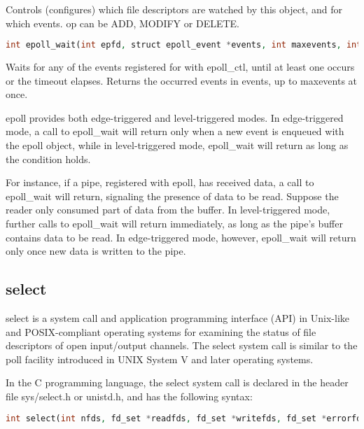 Controls (configures) which file descriptors are watched by this object, and for which events. op can be ADD, MODIFY or DELETE.





\begin{lstlisting}[language=PHP]
int epoll_wait(int epfd, struct epoll_event *events, int maxevents, int timeout);
\end{lstlisting}

Waits for any of the events registered for with epoll_ctl, until at least one occurs or the timeout elapses. Returns the occurred events in events, up to maxevents at once.

epoll provides both edge-triggered and level-triggered modes. In edge-triggered mode, a call to epoll\_wait will return only when a new event is enqueued with the epoll object, while in level-triggered mode, epoll\_wait will return as long as the condition holds.

For instance, if a pipe, registered with epoll, has received data, a call to epoll\_wait will return, signaling the presence of data to be read. Suppose the reader only consumed part of data from the buffer. In level-triggered mode, further calls to epoll\_wait will return immediately, as long as the pipe's buffer contains data to be read. In edge-triggered mode, however, epoll\_wait will return only once new data is written to the pipe.



\subsection{select}

select is a system call and application programming interface (API) in Unix-like and POSIX-compliant operating systems for examining the status of file descriptors of open input/output channels. The select system call is similar to the poll facility introduced in UNIX System V and later operating systems.

In the C programming language, the select system call is declared in the header file sys/select.h or unistd.h, and has the following syntax:

\begin{lstlisting}[language=PHP]
int select(int nfds, fd_set *readfds, fd_set *writefds, fd_set *errorfds, struct timeval *timeout);
\end{lstlisting}



